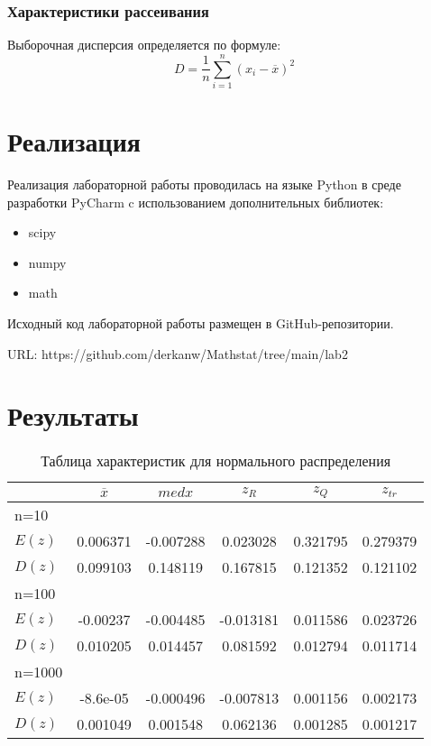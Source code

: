 \documentclass[12pt,a4paper]{article}
\begin{document}
\subsubsection{Характеристики рассеивания}
Выборочная дисперсия определяется по формуле:
\begin{equation}
    D=\frac{1}{n}\sum^{n}_{i=1}{(x_i-\overline{x})^2}
\end{equation}

\section{Реализация}
Реализация лабораторной работы проводилась на языке Python в среде разработки PyCharm c использованием дополнительных библиотек:
\begin{itemize}
    \item scipy
    \item numpy
    \item math
\end{itemize}

Исходный код лабораторной работы размещен в GitHub-репозитории.

URL: https://github.com/derkanw/Mathstat/tree/main/lab2

\section {Результаты}
\begin{table}[H]
    \centering
    \begin{tabular}{|l||c|c|c|c|c|}
        \hline
        & $\overline{x}$ & $med x$ & $z_R$ & $z_Q$ & $z_{tr}$\\\hline\hline
        n=10 & & & & &\\\hline
        $E(z)$ & 0.006371 & -0.007288 & 0.023028 & 0.321795 & 0.279379\\\hline
        $D(z)$ & 0.099103 & 0.148119 & 0.167815 & 0.121352 & 0.121102\\\hline
        n=100 & & & & &\\\hline
        $E(z)$ & -0.00237 & -0.004485 & -0.013181 & 0.011586 & 0.023726\\\hline
        $D(z)$ & 0.010205 & 0.014457 & 0.081592 & 0.012794 & 0.011714\\\hline
        n=1000 & & & & &\\\hline
        $E(z)$ & -8.6e-05 & -0.000496 & -0.007813 & 0.001156 & 0.002173\\\hline
        $D(z)$ & 0.001049 & 0.001548 & 0.062136 & 0.001285 & 0.001217\\\hline
    \end{tabular}
    \caption{Таблица характеристик для нормального распределения}
    \label{tab:normal}
\end{table}
\end{document}
